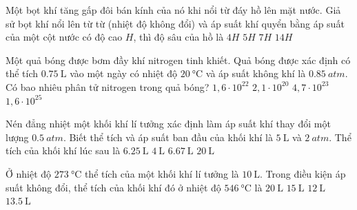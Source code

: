 \begin{ex}
	Một bọt khí tăng gấp đôi bán kính của nó khi nổi từ đáy hồ lên mặt nước. Giả sử bọt khí nổi lên từ từ (nhiệt độ không đổi) và áp suất khí quyển bằng áp suất của một cột nước có độ cao $H$, thì độ sâu của hồ là
	\choice
	{$4 H$}
	{$5 H$}
	{\True $7 H$}
	{$14 H$}
	\loigiai{}
\end{ex}
\begin{ex}
	Một quả bóng được bơm đầy khí nitrogen tinh khiết. Quả bóng được xác định có thể tích $\SI{0.75}{\liter}$ vào một ngày có nhiệt độ $\SI{20}{\celsius}$ và áp suất không khí là $\SI{0.85}{atm}$. Có bao nhiêu phân tử nitrogen trong quả bóng?
	\choice
	{\True $1,6 \cdot 10^{22}$}
	{$2,1\cdot10^{20}$}
	{$4,7\cdot10^{23}$}
	{$1,6 \cdot 10^{25}$}
	\loigiai{}
\end{ex}
\begin{ex}
	Nén đẳng nhiệt một khối khí lí tưởng xác định làm áp suất khí thay đổi một lượng $\SI{0.5}{atm}$. Biết thể tích và áp suất ban đầu của khối khí là $\SI{5}{\liter}$ và $\SI{2}{atm}$. Thể tích của khối khí lúc sau là
	\choice
	{$\SI{6.25}{\liter}$}
	{\True $\SI{4}{\liter}$}
	{$\SI{6.67}{\liter}$}
	{$\SI{20}{\liter}$}
\end{ex}
\begin{ex}
	Ở nhiệt độ $\SI{273}{\celsius}$ thể tích của một khối khí lí tưởng là $\SI{10}{\liter}$. Trong điều kiện áp suất không đổi, thể tích của khối khí đó ở nhiệt độ $\SI{546}{\celsius}$ là
	\choice
	{$\SI{20}{\liter}$}
	{\True $\SI{15}{\liter}$}
	{$\SI{12}{\liter}$}
	{$\SI{13.5}{\liter}$}
\end{ex}
